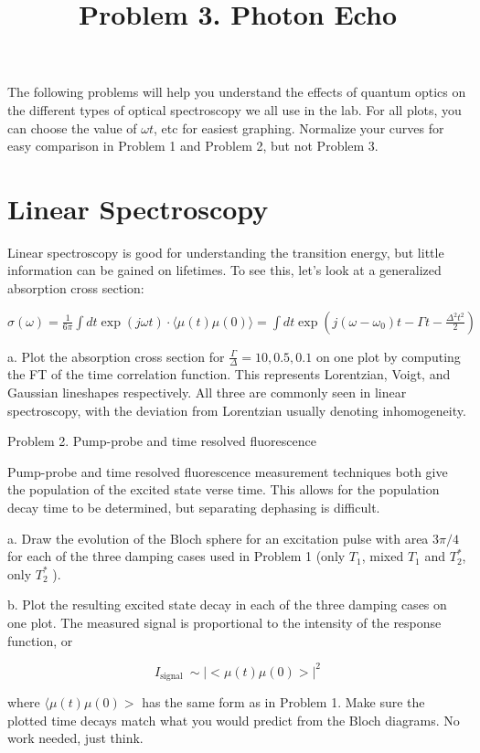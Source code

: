 \documentclass[12pt]{article}
\title{Problem 3. Photon Echo }
\author{}
\date{}
\begin{document}
\maketitle
The following problems will help you understand the effects of quantum optics on the different types of optical spectroscopy we all use in the lab. For all plots, you can choose the value of $\omega t$, etc for easiest graphing. Normalize your curves for easy comparison in Problem 1 and Problem 2, but not Problem 3.

\section{Linear Spectroscopy}

Linear spectroscopy is good for understanding the transition energy, but little information can be gained on lifetimes. To see this, let's look at a generalized absorption cross section:

$\sigma(\omega)=\frac{1}{6 \pi} \int d t \exp (j \omega t) \cdot\langle\mu(t) \mu(0)\rangle=\int d t \exp \left(j\left(\omega-\omega_{0}\right) t-\Gamma t-\frac{\Delta^{2} t^{2}}{2}\right)$

a. Plot the absorption cross section for $\frac{\Gamma}{\Delta}=10,0.5,0.1$ on one plot by computing the FT of the time correlation function. This represents Lorentzian, Voigt, and Gaussian lineshapes respectively. All three are commonly seen in linear spectroscopy, with the deviation from Lorentzian usually denoting inhomogeneity.

Problem 2. Pump-probe and time resolved fluorescence

Pump-probe and time resolved fluorescence measurement techniques both give the population of the excited state verse time. This allows for the population decay time to be determined, but separating dephasing is difficult.

a. Draw the evolution of the Bloch sphere for an excitation pulse with area $3 \pi / 4$ for each of the three damping cases used in Problem 1 (only $T_{1}$, mixed $T_{1}$ and $T_{2}^{*}$, only $T_{2}^{*}$ ).

b. Plot the resulting excited state decay in each of the three damping cases on one plot. The measured signal is proportional to the intensity of the response function, or

$$
I_{\text {signal }} \sim|<\mu(t) \mu(0)>|^{2}
$$

where $\langle\mu(t) \mu(0)>$ has the same form as in Problem 1. Make sure the plotted time decays match what you would predict from the Bloch diagrams. No work needed, just think.
\end{document}
